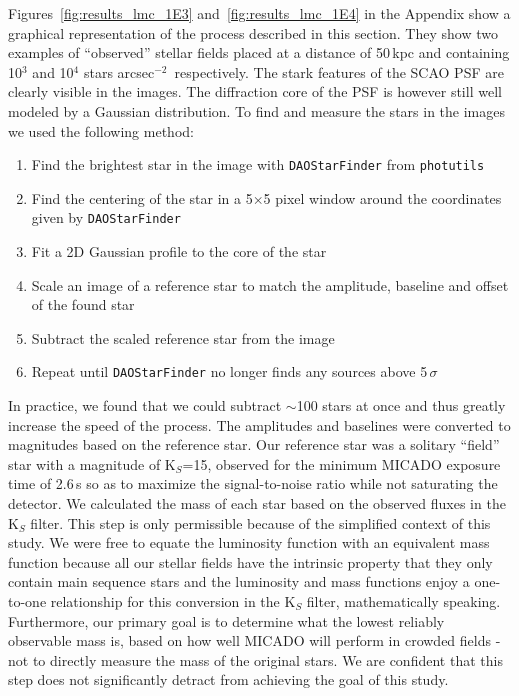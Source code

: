 \documentclass{aa}
\newcommand{\sig}{$\sigma$~}
\newcommand{\s}{$\sim$}
\newcommand{\spa}{stars arcsec$^{-2}$~}
\begin{document}
Figures~\ref{fig:results_lmc_1E3} and~\ref{fig:results_lmc_1E4} in the Appendix show a graphical representation of the process described in this section.
They show two examples of ``observed'' stellar fields placed at a distance of 50\,kpc and containing 10$^3$ and 10$^4$ \spa respectively.
The stark features of the SCAO PSF are clearly visible in the images.
The diffraction core of the PSF is however still well modeled by a Gaussian distribution.
To find and measure the stars in the images we used the following method:

\begin{enumerate}
    \item Find the brightest star in the image with \verb+DAOStarFinder+ from \verb+photutils+~\citep{photutils}
    \item Find the centering of the star in a 5$\times$5 pixel window around the coordinates given by \verb+DAOStarFinder+
    \item Fit a 2D Gaussian profile to the core of the star
    \item Scale an image of a reference star to match the amplitude, baseline and offset of the found star
    \item Subtract the scaled reference star from the image
    \item Repeat until \verb+DAOStarFinder+ no longer finds any sources above 5\,\sig
\end{enumerate}

In practice, we found that we could subtract \s100 stars at once and thus greatly increase the speed of the process.
The amplitudes and baselines were converted to magnitudes based on the reference star.
Our reference star was a solitary ``field'' star with a magnitude of K$_S$=15, observed for the minimum {MICADO} exposure time of 2.6\,s so as to maximize the signal-to-noise ratio while not saturating the detector.
We calculated the mass of each star based on the observed fluxes in the K$_S$ filter.
This step is only permissible because of the simplified context of this study.
We were free to equate the luminosity function with an equivalent mass function because all our stellar fields have the intrinsic property that they only contain main sequence stars and the luminosity and mass functions enjoy a one-to-one relationship for this conversion in the K$_S$ filter, mathematically speaking.
Furthermore, our primary goal is to determine what the lowest reliably observable mass is, based on how well MICADO will perform in crowded fields - not to directly measure the mass of the original stars.
We are confident that this step does not significantly detract from achieving the goal of this study.
\end{document}

